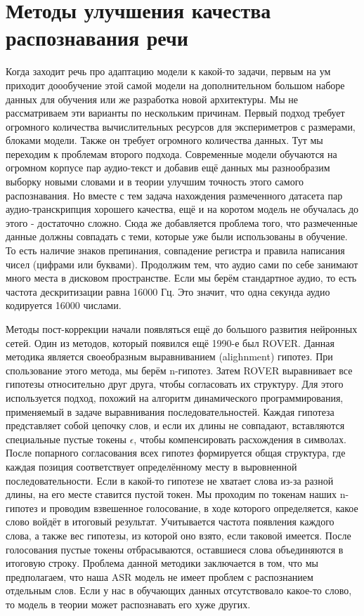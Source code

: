 \section{Методы улучшения качества распознавания речи}
Когда заходит речь про адаптацию модели к какой-то задачи, первым на ум приходит доообучение этой самой модели на дополнительном большом наборе данных для обучения или же разработка новой архитектуры.
Мы не рассматриваем эти варианты по нескольким причинам.
Первый подход требует огромного количества вычислительных ресурсов для экспериметров с размерами, блоками модели.
Также он требует огромного количества данных.
Тут мы переходим к проблемам второго подхода.
Современные модели обучаются на огромном корпусе пар аудио-текст и добавив ещё данных мы разнообразим выборку новыми словами и в теории улучшим точность этого самого распознавания.
Но вместе с тем задача нахождения размеченного датасета пар аудио-транскрипция хорошего качества, ещё и на коротом модель не обучалась до этого - достаточно сложно.
Сюда же добавляется проблема того, что размеченные данные должны совпадать с теми, которые уже были использованы в обучение.
То есть наличие знаков препинания, совпадение регистра и правила написания чисел (цифрами или буквами).
Продолжим тем, что аудио сами по себе занимают много места в дисковом пространстве.
Если мы берём стандартное аудио, то есть частота дескритизации равна 16000 Гц.
Это значит, что одна секунда аудио кодируется 16000 числами.

Методы пост-коррекции начали появляться ещё до большого развития нейронных сетей.
Один из методов, который появился ещё 1990-е был ROVER.
Данная методика является своеобразным выравниванием (alighnment) гипотез.
При спользование этого метода, мы берём n-гипотез. 
Затем ROVER выравнивает все гипотезы относительно друг друга, чтобы согласовать их структуру.
Для этого используется подход, похожий на алгоритм динамического программирования, применяемый в задаче выравнивания последовательностей.
Каждая гипотеза представляет собой цепочку слов, и если их длины не совпадают, вставляются специальные пустые токены $\epsilon$, чтобы компенсировать расхождения в символах.
После попарного согласования всех гипотез формируется общая структура, где каждая позиция соответствует определённому месту в выровненной последовательности.
Если в какой-то гипотезе не хватает слова из-за разной длины, на его месте ставится пустой токен.
Мы проходим по токенам наших n-гипотез и проводим взвешенное голосование, в ходе которого определяется, какое слово войдёт в итоговый результат.
Учитывается частота появления каждого слова, а также вес гипотезы, из которой оно взято, если таковой имеется.
После голосования пустые токены отбрасываются, оставшиеся слова объединяются в итоговую строку.
Проблема данной методики заключается в том, что мы предполагаем, что наша ASR модель не имеет проблем с распознанием отдельным слов.
Если у нас в обучающих данных отсутствовало какое-то слово, то модель в теории может распознавать его хуже других.

